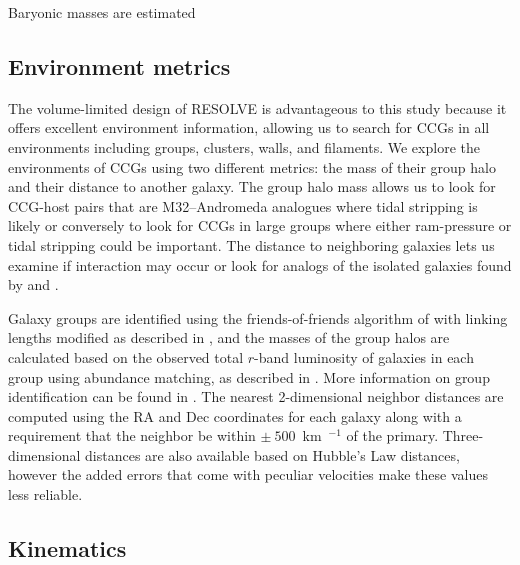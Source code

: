 \documentclass[iop,apj]{emulateapj}
\begin{document}
Baryonic masses are estimated 


\subsection{Environment metrics}
\label{env}
\noindent The volume-limited design of RESOLVE is advantageous to this study because it offers excellent environment information, allowing us to search for CCGs in all environments including groups, clusters, walls, and filaments. We explore the environments of CCGs using two different metrics: the mass of their group halo and their distance to another galaxy. The group halo mass allows us to look for CCG-host pairs that are M32--Andromeda analogues where tidal stripping is likely or conversely to look for CCGs in large groups where either ram-pressure or tidal stripping could be important. The distance to neighboring galaxies lets us examine if interaction may occur or look for analogs of the isolated galaxies found by \citet{Huxor2013} and \citet{Paudel2014}.

Galaxy groups are identified using the friends-of-friends algorithm of \citet{Berlind2006} with linking lengths modified as described in \citet{Eckert2016}, and the masses of the group halos are calculated based on the observed total $r$-band luminosity of galaxies in each group using abundance matching, as described in \citet{Blanton2007}. More information on group identification can be found in \citet{Eckert2016}. The nearest 2-dimensional neighbor distances are computed using the RA and Dec coordinates for each galaxy along with a requirement that the neighbor be within $\pm~500$~km~$^{-1}$ of the primary. Three-dimensional distances are also available based on Hubble's Law distances, however the added errors that come with peculiar velocities make these values less reliable.

\subsection{Kinematics}
\label{kindata}
\end{document}
